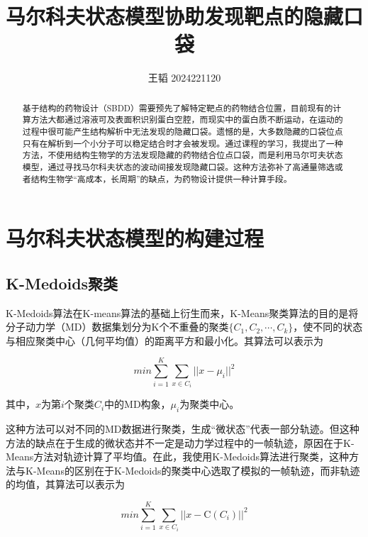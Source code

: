 \documentclass[a4paper]{article}
\title{马尔科夫状态模型协助发现靶点的隐藏口袋}                   %
\author{王韬 2024221120}
\begin{document}
	
\begin{CJK}{UTF8}{gbsn}
\maketitle

\begin{center}
\tableofcontents
\end{center}

 \begin{abstract}

基于结构的药物设计（SBDD）需要预先了解特定靶点的药物结合位置，目前现有的计算方法大都通过溶液可及表面积识别蛋白空腔，而现实中的蛋白质不断运动，在运动的过程中很可能产生结构解析中无法发现的隐藏口袋。遗憾的是，大多数隐藏的口袋位点只有在解析到一个小分子可以稳定结合时才会被发现。通过课程的学习，我提出了一种方法，不使用结构生物学的方法发现隐藏的药物结合位点口袋，而是利用马尔可夫状态模型，通过寻找马尔科夫状态的波动间接发现隐藏口袋。这种方法弥补了高通量筛选或者结构生物学“高成本，长周期”的缺点，为药物设计提供一种计算手段。

 \end{abstract}
\newpage


\section{马尔科夫状态模型的构建过程}
	\subsection{K-Medoids聚类}

K-Medoids算法在K-means算法的基础上衍生而来，K-Means聚类算法的目的是将分子动力学（MD）数据集划分为K个不重叠的聚类$\{C_{1},C_{2}, \cdots,  C_{k}\}$，使不同的状态与相应聚类中心（几何平均值）的距离平方和最小化。其算法可以表示为

\begin{equation}
min\sum_{i=1}^{K}\sum_{x\in C_{i}}^{} {\vert\vert x- \mu_{i} \vert\vert}^{2}
\end{equation}

其中，$x$为第$i$个聚类$C_{i}$中的MD构象，$\mu_{i}$为聚类中心。


这种方法可以对不同的MD数据进行聚类，生成“微状态”代表一部分轨迹。但这种方法的缺点在于生成的微状态并不一定是动力学过程中的一帧轨迹，原因在于K-Means方法对轨迹计算了平均值。在此，我使用K-Medoids算法进行聚类，这种方法与K-Means的区别在于K-Medoids的聚类中心选取了模拟的一帧轨迹，而非轨迹的均值，其算法可以表示为

\begin{equation}
min\sum_{i=1}^{K}\sum_{x\in C_{i}}^{} {\vert\vert x- \mathrm C(C_{i}) \vert\vert}^{2}
\end{equation}



\end{CJK}
\end{document}
